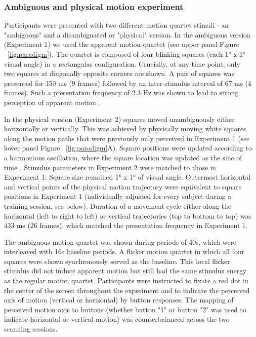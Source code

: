 \subsubsection{Ambiguous and physical motion experiment}
Participants were presented with two different motion quartet stimuli - an "ambiguous" and a disambiguated or "physical" version. In the ambiguous version (Experiment 1) we used the apparent motion quartet \parencite{Ramachandran1985} (see upper panel Figure ~\ref{fig:paradigm}). The quartet is composed of four blinking squares (each 1° x 1° visual angle) in a rectangular configuration. Crucially, at any time point, only two squares at diagonally opposite corners are shown. A pair of squares was presented for 150 ms (9 frames) followed by an inter-stimulus interval of 67 ms (4 frames). Such a presentation frequency of 2.3 Hz was shown to lead to strong perception of apparent motion \parencite{Finlay1987}.

In the physical version (Experiment 2) squares moved unambiguously either horizontally or vertically. This was achieved by physically moving white squares along the motion paths that were previously only perceived in Experiment 1 (see lower panel Figure ~\ref{fig:paradigm}A). Square positions were updated according to a harmonious oscillation, where the square location was updated as the sine of time \parencite{Muckli2005}. Stimulus parameters in Experiment 2 were matched to those in Experiment 1: Square size remained 1° x 1° of visual angle. Outermost horizontal and vertical points of the physical motion trajectory were equivalent to square positions in Experiment 1 (individually adjusted for every subject during a training session, see below). Duration of a movement cycle either along the horizontal (left to right to left) or vertical trajectories (top to bottom to top) was 433 ms (26 frames), which matched the presentation frequency in Experiment 1.

The ambiguous motion quartet was shown during periods of 40s, which were interleaved with 16s baseline periods. A flicker motion quartet in which all four squares were shown synchronously served as the baseline. This local flicker stimulus did not induce apparent motion but still had the same stimulus energy as the regular motion quartet. Participants were instructed to fixate a red dot in the center of the screen throughout the experiment and to indicate the perceived axis of motion (vertical or horizontal) by button responses. The mapping of perceived motion axis to buttons (whether button "1" or button "2" was used to indicate horizontal or vertical motion) was counterbalanced across the two scanning sessions.

